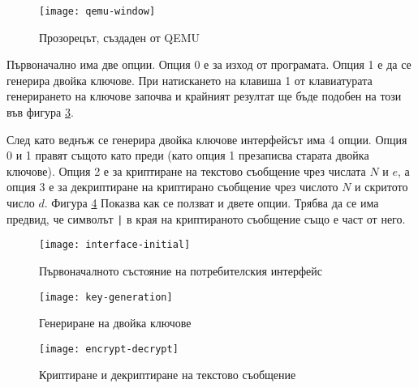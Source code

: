  \begin{figure}[htpb]
    \centering
    \texttt{[image: qemu-window]}
    \caption{Прозорецът, създаден от QEMU}
    \label{fig:qemu-window}
  \end{figure}

  Първоначално има две опции. Опция 0 е за изход от програмата. Опция 1 е да се генерира двойка ключове. При натискането на клавиша 1 от клавиатурата генерирането на ключове започва и крайният резултат ще бъде подобен на този във фигура \ref{fig:interface-key-generation}.

  След като веднъж се генерира двойка ключове интерфейсът има 4 опции. Опция 0 и 1 правят същото като преди (като опция 1 презаписва старата двойка ключове). Опция 2 е за криптиране на текстово съобщение чрез числата $N$ и $e$, а опция 3 е за декриптиране на криптирано съобщение чрез числото $N$ и скритото число $d$. Фигура \ref{fig:interface-encrypt-decrypt} Показва как се ползват и двете опции. Трябва да се има предвид, че символът {\tt |} в края на криптираното съобщение също е част от него.

  \begin{figure}[htpb]
    \centering
    \texttt{[image: interface-initial]}
    \caption{Първоначалното състояние на потребителския интерфейс}
    \label{fig:interface-initial}
  \end{figure}

  \begin{figure}[htpb]
    \centering
    \texttt{[image: key-generation]}
    \caption{Генериране на двойка ключове}
    \label{fig:interface-key-generation}
  \end{figure}

  \begin{figure}[htpb]
    \centering
    \texttt{[image: encrypt-decrypt]}
    \caption{Криптиране и декриптиране на текстово съобщение}
    \label{fig:interface-encrypt-decrypt}
  \end{figure}
